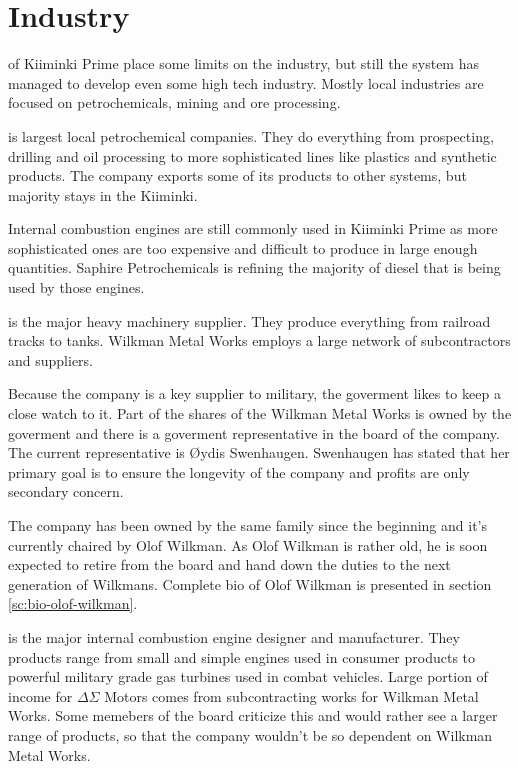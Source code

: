 \documentclass{tufte-book}
\begin{document}
\section{Industry}
\label{sc:industry}

 of Kiiminki Prime place some limits on the
industry, but still the system has managed to develop even some high tech
industry. Mostly local industries are focused on petrochemicals, mining and
ore processing.

 is largest local petrochemical companies.
They do everything from prospecting, drilling and oil processing to more
sophisticated lines like plastics and synthetic products. The company exports
some of its products to other systems, but majority stays in the Kiiminki.

Internal combustion engines are still commonly used in Kiiminki Prime as
more sophisticated ones are too expensive and difficult to produce in large
enough quantities. Saphire Petrochemicals is refining the majority of diesel
that is being used by those engines.

 is the major heavy machinery supplier. They
produce everything from railroad tracks to tanks. Wilkman Metal Works employs
a large network of subcontractors and suppliers.

Because the company is a key supplier to military, the goverment likes to
keep a close watch to it. Part of the shares of the Wilkman Metal Works is
owned by the goverment and there is a goverment representative in the board
of the company. The current representative is \O ydis Swenhaugen. Swenhaugen
has stated that her primary goal is to ensure the longevity of the company
and profits are only secondary concern.

The company has been owned by the same family since the beginning and it's
currently chaired by Olof Wilkman. As Olof Wilkman is rather old, he is soon
expected to retire from the board and hand down the duties to the next
generation of Wilkmans. Complete bio of Olof Wilkman is presented in section
\ref{sc:bio-olof-wilkman}.

 is the major internal combustion engine
designer and manufacturer. They products range from small and simple engines
used in consumer products to powerful military grade gas turbines used in
combat vehicles. Large portion of income for $\Delta$$\Sigma$  Motors comes
from subcontracting works for Wilkman Metal Works. Some memebers of the board
criticize this and would rather see a larger range of products, so that the
company wouldn't be so dependent on Wilkman Metal Works.
\end{document}
